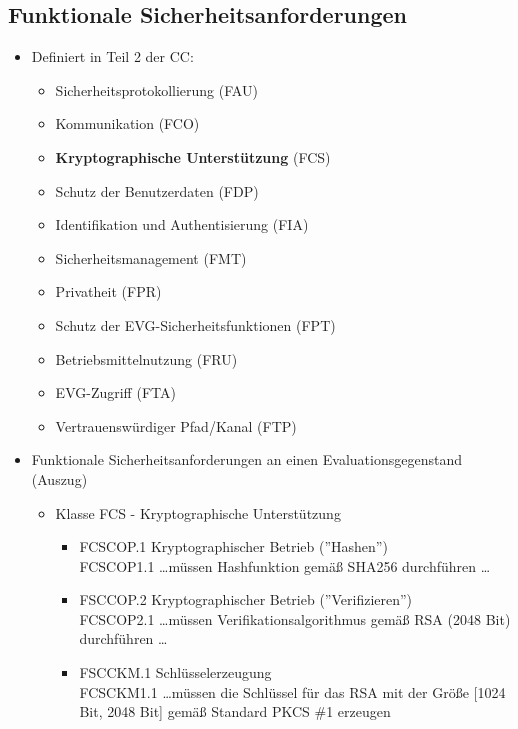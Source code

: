 \documentclass[openany]{book}
\begin{document}
\subsection{Funktionale Sicherheitsanforderungen}

\begin{itemize}
    \item Definiert in Teil 2 der CC:
    \begin{itemize}
        \item Sicherheitsprotokollierung (FAU)
        \item Kommunikation (FCO)
        \item \textbf{Kryptographische Unterstützung} (FCS)
        \item Schutz der Benutzerdaten (FDP)
        \item Identifikation und Authentisierung (FIA)
        \item Sicherheitsmanagement (FMT)
        \item Privatheit (FPR)
        \item Schutz der EVG-Sicherheitsfunktionen (FPT)
        \item Betriebsmittelnutzung (FRU)
        \item EVG-Zugriff (FTA)
        \item Vertrauenswürdiger Pfad/Kanal (FTP)
    \end{itemize}
    \item Funktionale Sicherheitsanforderungen an einen Evaluationsgegenstand (Auszug)
    \begin{itemize}
        \item Klasse FCS - Kryptographische Unterstützung
        \begin{itemize}
            \item FCS\textunderscore COP.1 Kryptographischer Betrieb (''Hashen'')\\ FCS\textunderscore COP1.1 \dots müssen Hashfunktion gemäß SHA256 durchführen \dots
            \item FSC\textunderscore COP.2 Kryptographischer Betrieb (''Verifizieren'')\\ FCS\textunderscore COP2.1 \dots müssen Verifikationsalgorithmus gemäß RSA (2048 Bit) durchführen \dots
            \item FSC\textunderscore CKM.1 Schlüsselerzeugung\\ FCS\textunderscore CKM1.1 \dots müssen die Schlüssel für das RSA mit der Größe [1024 Bit, 2048 Bit] gemäß Standard PKCS \#1 erzeugen
        \end{itemize}
    \end{itemize}
\end{itemize}
\end{document}

